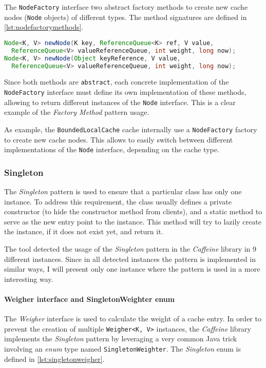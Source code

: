 \noindent The \texttt{NodeFactory} interface two abstract factory methods to create new cache nodes (\texttt{Node} objects) of different types. The method signatures are defined in \autoref{lst:nodefactorymethods}.

\begin{lstlisting}[language=Java, caption={NodeFactory abstract factory methods to create \texttt{Node} objects}, captionpos=b, label={lst:nodefactorymethods}]
Node<K, V> newNode(K key, ReferenceQueue<K> ref, V value,
  ReferenceQueue<V> valueReferenceQueue, int weight, long now);
Node<K, V> newNode(Object keyReference, V value,
  ReferenceQueue<V> valueReferenceQueue, int weight, long now);
\end{lstlisting}

\noindent Since both methods are \texttt{abstract}, each concrete implementation of the \texttt{NodeFactory} interface must define its own implementation of these methods, allowing to return different instances of the \texttt{Node} interface. This is a clear example of the \textit{Factory Method} pattern usage.

As example, the \texttt{BoundedLocalCache} cache internally use a \texttt{NodeFactory} factory to create new cache nodes. This allows to easily switch between different implementations of the \texttt{Node} interface, depending on the cache type.

\subsubsection{Singleton}
\label{sec:singleton}

The \textit{Singleton} pattern is used to ensure that a particular class has only one instance. To address this requirement, the class usually defines a private constructor (to hide the constructor method from clients), and a static method to serve as the new entry point to the instance. This method will try to lazily create the instance, if it does not exist yet, and return it.

The tool detected the usage of the \textit{Singleton} pattern in the \textit{Caffeine} library in 9 different instances. Since in all detected instances the pattern is implemented in similar ways, I will present only one instance where the pattern is used in a more interesting way.

\paragraph{Weigher interface and SingletonWeighter enum} The \textit{Weigher} interface is used to calculate the weight of a cache entry. In order to prevent the creation of multiple \texttt{Weigher<K, V>} instances, the \textit{Caffeine} library implements the \textit{Singleton} pattern by leveraging a very common Java trick involving an \textit{enum} type named \texttt{SingletonWeighter}. The \textit{Singleton} enum is defined in \autoref{lst:singletonweigher}.


